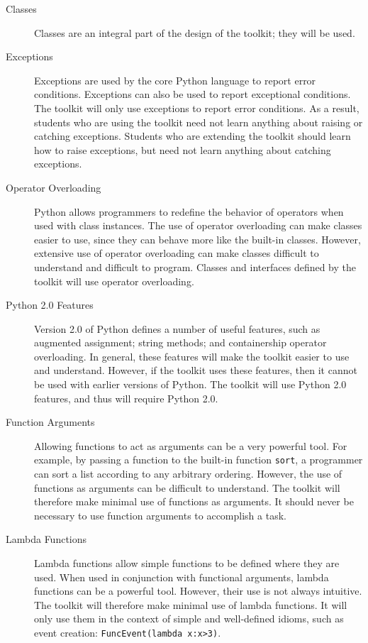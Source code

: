 \documentclass{article}
\begin{document}
\begin{description}

  \item[Classes] Classes are an integral part of the design of the
  toolkit; they will be used.

  \item[Exceptions] Exceptions are used by the core Python language to
  report error conditions.  Exceptions can also be used to report
  exceptional conditions.  The toolkit will only use exceptions to
  report error conditions.  As a result, students who are using the
  toolkit need not learn anything about raising or catching
  exceptions.  Students who are extending the toolkit should learn how
  to raise exceptions, but need not learn anything about catching
  exceptions.

  \item[Operator Overloading] Python allows programmers to redefine
  the behavior of operators when used with class instances.  The use
  of operator overloading can make classes easier to use, since they
  can behave more like the built-in classes.  However, extensive use
  of operator overloading can make classes difficult to understand and
  difficult to program.  Classes and interfaces defined by the toolkit
  will use operator overloading.

  \item[Python 2.0 Features] Version 2.0 of Python defines a number of
  useful features, such as augmented assignment; string methods; and
  containership operator overloading.  In general, these features will
  make the toolkit easier to use and understand.  However, if the
  toolkit uses these features, then it cannot be used with earlier
  versions of Python.  The toolkit will use Python 2.0 features, and
  thus will require Python 2.0.

  \item[Function Arguments] Allowing functions to act as arguments can
  be a very powerful tool.  For example, by passing a function to the
  built-in function \texttt{sort}, a programmer can sort a list
  according to any arbitrary ordering.  However, the use of functions
  as arguments can be difficult to understand.  The toolkit will
  therefore make minimal use of functions as arguments.  It should
  never be necessary to use function arguments to accomplish a task.

  \item[Lambda Functions] Lambda functions allow simple functions to
  be defined where they are used.  When used in conjunction with
  functional arguments, lambda functions can be a powerful tool.
  However, their use is not always intuitive.  The toolkit will
  therefore make minimal use of lambda functions.  It will only use
  them in the context of simple and well-defined idioms, such as event
  creation: \texttt{FuncEvent(lambda~x:x>3)}.
        

\end{description}
\end{document}

